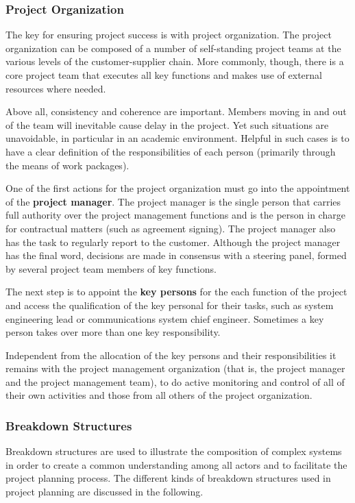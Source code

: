 \subsubsection{Project Organization}

The key for ensuring project success is with project organization. The project organization can be composed of a number of self-standing project teams at the various levels of the customer-supplier chain. More commonly, though, there is a core project team that executes all key functions and makes use of external resources where needed. 

Above all, consistency and coherence are important. Members moving in and out of the team will inevitable cause delay in the project. Yet such situations are unavoidable, in particular in an academic environment. Helpful in such cases is to have a clear definition of the responsibilities of each person (primarily through the means of work packages). 

One of the first actions for the project organization must go into the appointment of the \textbf{project manager}. The project manager is the single person that carries full authority over the project management functions and is the person in charge for contractual matters (such as agreement signing). The project manager also has the task to regularly report to the customer. Although the project manager has the final word, decisions are made in consensus with a steering panel, formed by several project team members of key functions. 

The next step is to appoint the \textbf{key persons} for the each function of the project and access the qualification of the key personal for their tasks, such as system engineering lead or communications system chief engineer. Sometimes a key person takes over more than one key responsibility.

Independent from the allocation of the key persons and their responsibilities it remains with the project management organization (that is, the project manager and the project management team), to do active monitoring and control of all of their own activities and those from all others of the project organization. 

\subsubsection{Breakdown Structures}

Breakdown structures are used to illustrate the composition of complex systems in order to create a common understanding among all actors and to facilitate the project planning process. The different kinds of breakdown structures used in project planning are discussed in the following.

